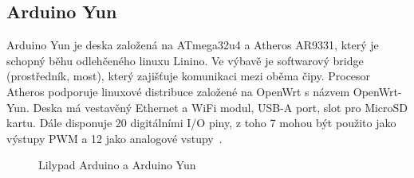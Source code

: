 	\subsection{Arduino Yun} 
	Arduino Yun je deska založená na ATmega32u4 a Atheros AR9331, který je schopný běhu odlehčeného linuxu Linino. Ve výbavě je softwarový bridge (prostředník, most), který zajišťuje komunikaci mezi oběma čipy. Procesor Atheros podporuje linuxové distribuce založené na OpenWrt s názvem OpenWrt-Yun. Deska má vestavěný Ethernet a WiFi modul, USB-A port, slot pro MicroSD kartu. Dále disponuje 20 digitálními I/O piny, z toho 7 mohou být použito jako výstupy PWM a 12 jako analogové vstupy~\cite{ArduinoYun}.	

	\begin{figure}[!ht]
    \centering
			\hspace*{5mm}
			\caption{Lilypad Arduino a Arduino Yun}
			\vspace{-10pt}	
\end{figure}
	

